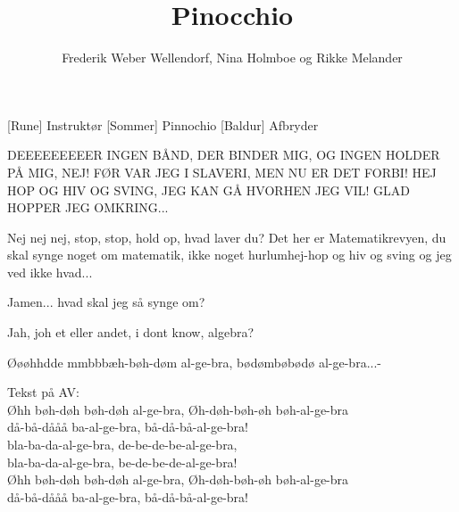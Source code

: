 \documentclass[a4paper,11pt]{article}
\title{Pinocchio}
\author{Frederik Weber Wellendorf, Nina Holmboe og Rikke Melander}
\begin{document}
\maketitle

\begin{roles}
[Rune] Instruktør
[Sommer] Pinnochio
[Baldur] Afbryder
\end{roles}



\begin{sketch}

 DEEEEEEEEER INGEN BÅND, DER BINDER MIG, OG INGEN HOLDER PÅ MIG, NEJ! FØR VAR JEG I SLAVERI, MEN NU ER DET FORBI! HEJ HOP OG HIV OG SVING, JEG KAN GÅ HVORHEN JEG VIL! GLAD HOPPER JEG OMKRING...


 Nej nej nej, stop, stop, hold op, hvad laver du? Det her er Matematikrevyen, du skal synge noget om matematik, ikke noget hurlumhej-hop og hiv og sving og jeg ved ikke hvad...


 Jamen... hvad skal jeg så synge om?

 Jah, joh et eller andet, i dont know, algebra?


 Øøøhhdde mmbbbæh-bøh-døm al-ge-bra, bødømbøbødø al-ge-bra...-


\end{sketch}

\noindent Tekst på AV: \\
Øhh bøh-døh bøh-døh al-ge-bra, Øh-døh-bøh-øh bøh-al-ge-bra \\
då-bå-dååå ba-al-ge-bra, bå-då-bå-al-ge-bra! \\
bla-ba-da-al-ge-bra, de-be-de-be-al-ge-bra, \\
bla-ba-da-al-ge-bra, be-de-be-de-al-ge-bra! \\
Øhh bøh-døh bøh-døh al-ge-bra, Øh-døh-bøh-øh bøh-al-ge-bra \\
då-bå-dååå ba-al-ge-bra, bå-då-bå-al-ge-bra!
\end{document}
